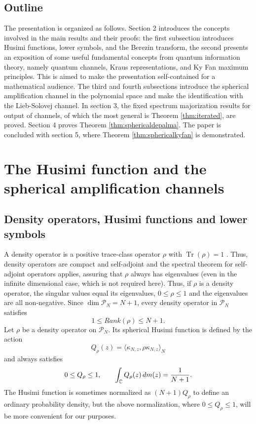 \documentclass[12pt]{amsart}
\theoremstyle{plain}
\theoremstyle{definition}
\theoremstyle{remark}
\numberwithin{equation}{section}
\newcommand{\func}[1]{\operatorname{#1}}
\newcommand{\1}{\mathbf 1}
\begin{document}
\subsection{Outline}

The presentation is organized as follows. Section 2 introduces the concepts involved in the main results and their proofs: the first subsection introduces Husimi functions, lower symbols, and the Berezin transform, the second presents an exposition of some useful fundamental concepts from quantum information theory, namely quantum channels, Kraus representations, and Ky Fan maximum principles. This is aimed to make the presentation self-contained for a mathematical audience. The third and fourth subsections introduce the spherical amplification channel in the polynomial space  and make the identification with the Lieb-Solovej channel. In section 3, the
fixed spectrum majorization results for output of channels, of which the most general is
Theorem \ref{thm:iterated}, are proved. Section 4 proves Theorem \ref{thm:sphericaldepalma}. The paper is concluded with
section 5, where Theorem \ref{thm:sphericalkyfan} is demonstrated.

\section{The Husimi function and the spherical amplification channels}

\subsection{Density operators, Husimi functions and lower symbols}

A density operator is a positive trace-class operator $\rho $ with $\func{Tr}%
(\rho )=1$ \cite[Section 2.1]{Petz}. Thus, density operators are compact and
self-adjoint and the spectral theorem for self-adjoint operators applies,
assuring that $\rho $ always has eigenvalues (even in the infinite
dimensional case, which is not required here). Thus, if $\rho $ is a density
operator, the singular values equal its eigenvalues, $0\leq \rho \leq 1$ and
the eigenvalues are all non-negative. Since $\dim \mathcal{P}_{N}=N+1$,
every density operator in $\mathcal{P}_{N}$ satisfies%
\begin{equation*}
1\leq Rank(\rho )\leq N+1\text{.}
\end{equation*}%
Let $\rho $ be a density operator on $\mathcal{P}_{N}$. Its spherical Husimi
function is defined by the action 
\begin{equation}
Q_{\rho }(z)=\langle \kappa _{N,z},\rho \kappa _{N,z}\rangle _{N}
\label{eq:husimi}
\end{equation}%
and always satisfies 
\begin{equation}
0\leq Q_{\rho }\leq 1,\qquad \int_{\mathbb{C}}Q_{\rho }(z)\,dm(z)=\frac{1}{%
N+1}.  \label{eq:husiminormalization}
\end{equation}%
The Husimi function is sometimes normalized as $(N+1)Q_{\rho }$ to define an
ordinary probability density, but the above normalization, where $0\leq
Q_{\rho }\leq 1$, will be more convenient for our purposes. 
\end{document}
